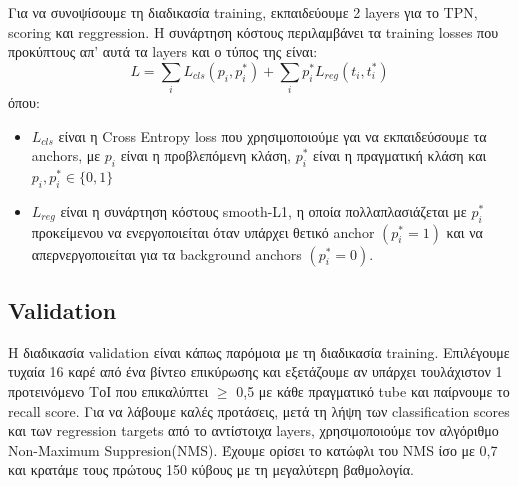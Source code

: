 \documentclass{report}
\begin{document}
Για να συνοψίσουμε τη διαδικασία training, εκπαιδεύουμε 2 layers για το TPN, scoring  και reggression. Η συνάρτηση κόστους περιλαμβάνει τα
training losses που προκύπτους απ' αυτά τα layers και ο τύπος της είναι:
\[ L  =  \sum_iL_{cls}(p_i, p_i^*) + \sum_ip_i^*L_{reg}(t_i,t_i^*) \]
όπου:
\begin{itemize}
\item $L_{cls} $ είναι η Cross Entropy loss που χρησιμοποιούμε γαι να εκπαιδεύσουμε τα anchors, με $p_i$ είναι η προβλεπόμενη κλάση, $p_i^*$ είναι η πραγματική κλάση και
  $p_i, p_i^* \in \{0,1\}$
\item $L_{reg} $ είναι η συνάρτηση κόστους smooth-L1, η οποία πολλαπλασιάζεται με $p_i^*$ προκείμενου να ενεργοποιείται όταν υπάρχει θετικό anchor $(p_i^* = 1)$
  και να απερνεργοποιείται για τα background anchors $(p_i^* = 0)$.
\end{itemize}

\subsection{Validation}

Η διαδικασία validation είναι κάπως παρόμοια με τη διαδικασία training.
Επιλέγουμε τυχαία 16 καρέ από ένα βίντεο επικύρωσης και εξετάζουμε αν υπάρχει τουλάχιστον 1 προτεινόμενο ΤοΙ
που επικαλύπτει $\ge$ 0,5 με κάθε πραγματικό tube και παίρνουμε το recall score.
Για να λάβουμε καλές προτάσεις, μετά τη λήψη των classification scores και των regression targets από το
αντίστοιχα layers, χρησιμοποιούμε τον αλγόριθμο Non-Maximum Suppresion(NMS).  Έχουμε ορίσει το κατώφλι του NMS ίσο με 0,7 
και κρατάμε τους πρώτους 150 κύβους με τη μεγαλύτερη βαθμολογία.
\end{document}
